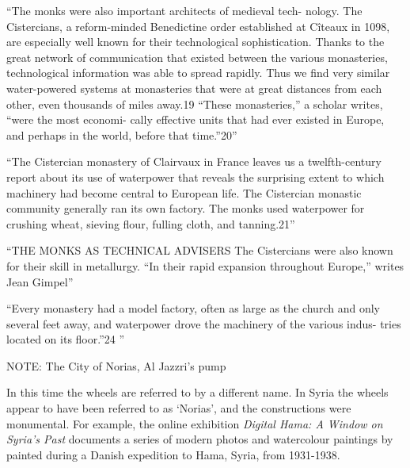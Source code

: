 \documentclass[a4paper, 12pt]{article}
\begin{document}


``The monks were also important architects of medieval tech- nology. The Cistercians, a reform-minded Benedictine order established at Cîteaux in 1098, are especially well known for their technological sophistication. Thanks to the great network of communication that existed between the various monasteries, technological information was able to spread rapidly. Thus we find very similar water-powered systems at monasteries that were at great distances from each other, even thousands of miles away.19 “These monasteries,” a scholar writes, “were the most economi- cally effective units that had ever existed in Europe, and perhaps in the world, before that time.”20'' \citep[p.~33]{woods_how_2005}

``The Cistercian monastery of Clairvaux in France leaves us a twelfth-century report about its use of waterpower that reveals the surprising extent to which machinery had become central to European life. The Cistercian monastic community generally ran its own factory. The monks used waterpower for crushing wheat, sieving flour, fulling cloth, and tanning.21'' \citep[p.~33]{woods_how_2005}


``THE MONKS AS TECHNICAL ADVISERS
The Cistercians were also known for their skill in metallurgy. “In their rapid expansion throughout Europe,” writes Jean Gimpel'' \citep[p.~35]{woods_how_2005}

``Every monastery had a model factory, often as large as the church and only several feet away, and waterpower drove the machinery of the various indus- tries located on its floor.”24 ''  \citep[p.~34]{woods_how_2005}


NOTE: The City of Norias, Al Jazzri's pump

In this time the wheels are referred to by a different name. In Syria the wheels appear to have been referred to as `Norias', and the constructions were monumental. For example, the online exhibition \textit{Digital Hama: A Window on Syria's Past} \citet{nationalmuseetikobenhavn_digital_2022} documents a series of modern photos and watercolour paintings by \citet{fugmann_water_1931,fugmann_water_1935,fugmann_water_1938} painted during a Danish expedition to Hama, Syria, from 1931-1938. 
\end{document}
